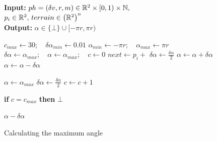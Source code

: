 {
  \centering
  \begin{figure}[h]
    \vspace{-\abovedisplayskip}
    \begin{algorithm}[H]
    \caption{Calculating the maximum angle}\label{alg:maxAngleCalc}
    \hspace*{\algorithmicindent} \textbf{Input:} $ph = (\delta v, r, m)\in{\mathbb{R}}^2\times[0,1)\times {\mathbb{N}}, \, $\\
    \hspace*{\algorithmicindent}  $p_i\in{\mathbb{R}}^2, \, terrain\in\left({\mathbb{R}}^2\right)^n$\\
    \hspace*{\algorithmicindent} \textbf{Output:} $\alpha\in \{\bot\}\cup[-\pi r, \pi r)$
      \begin{algorithmic}[1]
      \State $c_{max} \gets 30; \quad \delta\alpha_{min} \gets 0.01$
      \State $\alpha_{min} \gets -\pi r; \quad \alpha_{max} \gets \pi r$
      \State $\delta\alpha \gets \alpha_{max}; \quad \alpha \gets \alpha_{max}; \quad c \gets 0$
      \State $next\gets p_i + $
        \State $\delta\alpha \gets \frac{\delta\alpha}{2}$ 
        \State $\alpha \gets \alpha + \delta\alpha$
      \Else
        \State $\alpha \gets \alpha - \delta\alpha$ 
      \EndIf

       \algorithmiccomment{No $\alpha\in(\alpha_{min}, \alpha_{max}]$ found}
        \State $\alpha \gets \alpha_{max}$
        \State $\delta\alpha \gets \frac{\delta\alpha}{2}$ 
      \EndIf
      \State $c \gets c + 1$
      \EndWhile

      \State \textbf{if} $c = c_{max}$ \textbf{then} \Return $\bot$ 

      \State \Return $\alpha - \delta\alpha$ 
      \EndProcedure
      \end{algorithmic}
    \end{algorithm}
  \end{figure}
}


